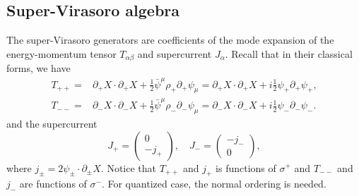 \documentclass[graybox,envcountchap,sectrefs]{svmono}
\begin{document}
\subsection{Super-Virasoro algebra}
The super-Virasoro generators are coefficients of the mode expansion of the energy-momentum tensor $T_{\alpha\beta}$ and supercurrent $J_{\alpha}$. Recall that in their classical forms, we have
\begin{align}
T_{++}=& \partial_{+} X \cdot \partial_{+} X+\frac{1}{2} \bar{\psi}^{\mu} \rho_{+} \partial_{+} \psi_{\mu}= \partial_{+} X \cdot \partial_{+} X+ i\frac{1}{2}\psi_{+} \partial_{+}\psi_{+},\\
T_{--}=& \partial_{-} X \cdot \partial_{-} X+\frac{1}{2} \bar{\psi}^{\mu} \rho_{-} \partial_{-} \psi_{\mu}= \partial_{-} X \cdot \partial_{-} X+i\frac{1}{2} \psi_{-}\partial_{-}\psi_{-}.
\end{align}
and the supercurrent
\begin{equation}
J_{+}=\left( \begin{array}{cc}
 	0\\
 	-j_{+}
 \end{array}
\right),\quad 
J_{-}=\left( \begin{array}{cc}
 	-j_{-}\\
 	0
 \end{array}
\right),
\end{equation}
where $j_{\pm}=2\psi_{\pm} \cdot \partial_{\pm} X$. 
Notice that $T_{++}$ and $j_+$ is functions of $\sigma^+$ and $T_{--}$ and $j_{-}$ are functions of $\sigma^-$. For quantized case, the normal ordering is needed.
\end{document}
